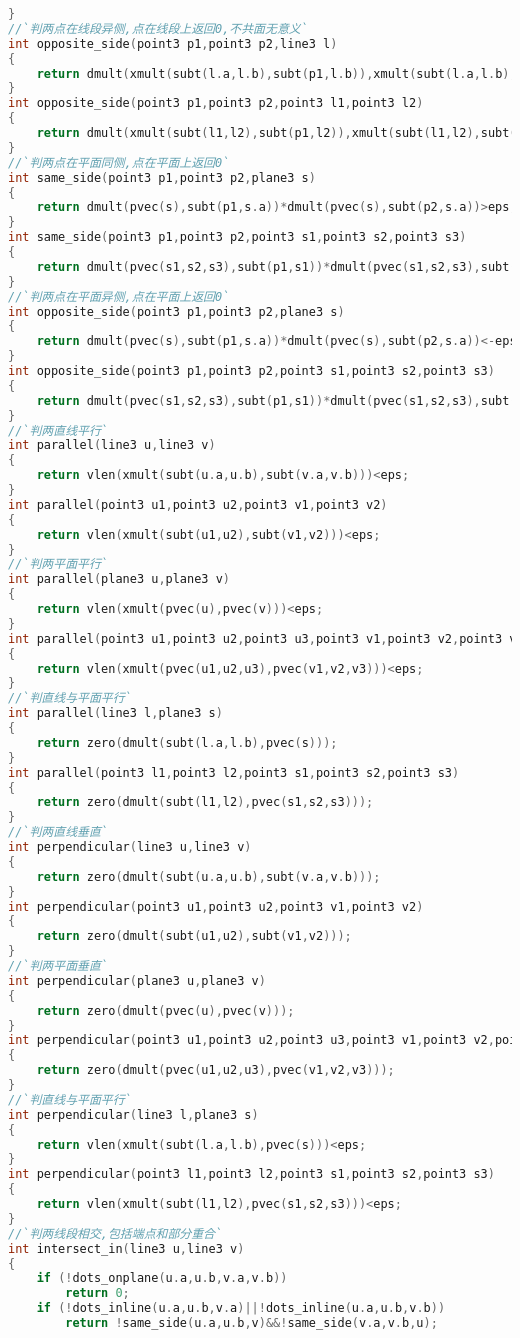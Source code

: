 \begin{lstlisting}[language=C++]
}
//`判两点在线段异侧,点在线段上返回0,不共面无意义`
int opposite_side(point3 p1,point3 p2,line3 l)
{
    return dmult(xmult(subt(l.a,l.b),subt(p1,l.b)),xmult(subt(l.a,l.b),subt(p2,l.b)))<-eps;
}
int opposite_side(point3 p1,point3 p2,point3 l1,point3 l2)
{
    return dmult(xmult(subt(l1,l2),subt(p1,l2)),xmult(subt(l1,l2),subt(p2,l2)))<-eps;
}
//`判两点在平面同侧,点在平面上返回0`
int same_side(point3 p1,point3 p2,plane3 s)
{
    return dmult(pvec(s),subt(p1,s.a))*dmult(pvec(s),subt(p2,s.a))>eps;
}
int same_side(point3 p1,point3 p2,point3 s1,point3 s2,point3 s3)
{
    return dmult(pvec(s1,s2,s3),subt(p1,s1))*dmult(pvec(s1,s2,s3),subt(p2,s1))>eps;
}
//`判两点在平面异侧,点在平面上返回0`
int opposite_side(point3 p1,point3 p2,plane3 s)
{
    return dmult(pvec(s),subt(p1,s.a))*dmult(pvec(s),subt(p2,s.a))<-eps;
}
int opposite_side(point3 p1,point3 p2,point3 s1,point3 s2,point3 s3)
{
    return dmult(pvec(s1,s2,s3),subt(p1,s1))*dmult(pvec(s1,s2,s3),subt(p2,s1))<-eps;
}
//`判两直线平行`
int parallel(line3 u,line3 v)
{
    return vlen(xmult(subt(u.a,u.b),subt(v.a,v.b)))<eps;
}
int parallel(point3 u1,point3 u2,point3 v1,point3 v2)
{
    return vlen(xmult(subt(u1,u2),subt(v1,v2)))<eps;
}
//`判两平面平行`
int parallel(plane3 u,plane3 v)
{
    return vlen(xmult(pvec(u),pvec(v)))<eps;
}
int parallel(point3 u1,point3 u2,point3 u3,point3 v1,point3 v2,point3 v3)
{
    return vlen(xmult(pvec(u1,u2,u3),pvec(v1,v2,v3)))<eps;
}
//`判直线与平面平行`
int parallel(line3 l,plane3 s)
{
    return zero(dmult(subt(l.a,l.b),pvec(s)));
}
int parallel(point3 l1,point3 l2,point3 s1,point3 s2,point3 s3)
{
    return zero(dmult(subt(l1,l2),pvec(s1,s2,s3)));
}
//`判两直线垂直`
int perpendicular(line3 u,line3 v)
{
    return zero(dmult(subt(u.a,u.b),subt(v.a,v.b)));
}
int perpendicular(point3 u1,point3 u2,point3 v1,point3 v2)
{
    return zero(dmult(subt(u1,u2),subt(v1,v2)));
}
//`判两平面垂直`
int perpendicular(plane3 u,plane3 v)
{
    return zero(dmult(pvec(u),pvec(v)));
}
int perpendicular(point3 u1,point3 u2,point3 u3,point3 v1,point3 v2,point3 v3)
{
    return zero(dmult(pvec(u1,u2,u3),pvec(v1,v2,v3)));
}
//`判直线与平面平行`
int perpendicular(line3 l,plane3 s)
{
    return vlen(xmult(subt(l.a,l.b),pvec(s)))<eps;
}
int perpendicular(point3 l1,point3 l2,point3 s1,point3 s2,point3 s3)
{
    return vlen(xmult(subt(l1,l2),pvec(s1,s2,s3)))<eps;
}
//`判两线段相交,包括端点和部分重合`
int intersect_in(line3 u,line3 v)
{
    if (!dots_onplane(u.a,u.b,v.a,v.b))
        return 0;
    if (!dots_inline(u.a,u.b,v.a)||!dots_inline(u.a,u.b,v.b))
        return !same_side(u.a,u.b,v)&&!same_side(v.a,v.b,u);

\end{lstlisting}
